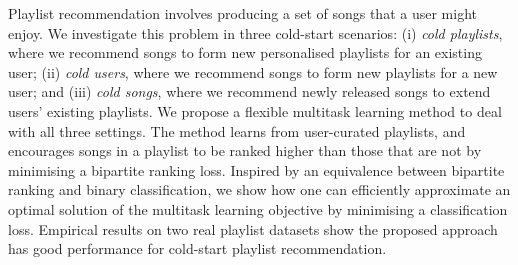 
Playlist recommendation involves producing a set of songs that a user might enjoy.
We investigate this problem in three %
cold-start scenarios:
(i) \emph{cold playlists}, 
where we recommend songs to form new personalised playlists for an existing user;
(ii) \emph{cold users},
where we recommend songs to form new playlists for a new user; and
(iii) \emph{cold songs}, where we recommend newly released songs to extend users' existing playlists.
%
We propose a flexible multitask learning method to deal with all three settings.
The method learns from user-curated playlists,
and encourages songs in a playlist 
to be ranked higher than those that are not
by minimising a %
bipartite ranking loss.
Inspired by an equivalence between bipartite ranking and binary classification,
we show how one can efficiently approximate an optimal solution of the multitask learning objective by 
minimising a classification loss.
%
Empirical results on two real playlist datasets show the proposed approach has good performance 
for cold-start playlist recommendation.
%
